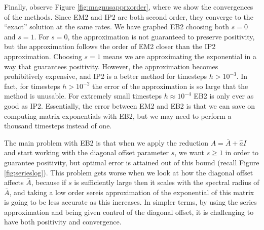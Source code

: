 Finally, observe Figure \ref{fig:magnusapprxorder}, where we show the convergences of the methods.
Since EM2 and IP2 are both second order, they converge to the ``exact'' solution at the same rates.
We have graphed EB2 choosing both $s=0$ and $s=1$. For $s=0$, the approximation is not guaranteed to preserve positivity,
but the approximation follows the order of EM2 closer than the IP2 approximation.
Choosing $s=1$ means we are approximating the exponential in a way that guarantees positivity.
However, the approximation becomes prohibitively expensive, and IP2 is a better method for timesteps $h > 10^{-3}$.
In fact, for timesteps $h > 10^{-2}$ the error of the approximation is so large that the method is unusable. 
For extremely small timesteps $h \approx 10^{-4}$ EB2 is only ever as good as IP2.
Essentially, the error between EM2 and EB2 is that we can save on computing matrix exponentials with EB2,
but we may need to perform a thousand timesteps instead of one.

The main problem with EB2 is that when we apply the reduction $A = \bar{A} + \hat{a}I$ and start working with the diagonal offset parameter $s$,
we want $s \ge 1$ in order to guarantee positivity, but optimal error is attained out of this bound (recall Figure \ref{fig:serieslog}).
This problem gets worse when we look at how the diagonal offset affects $\bar{A}$, because if $s$ is sufficiently large then it scales with the spectral radius of $\bar{A}$,
and taking a low order sereis approximation of the exponential of this matrix is going to be less accurate as this increases.
In simpler terms, by using the series approximation and being given control of the diagonal offset, it is challenging to have both positivity and convergence.







